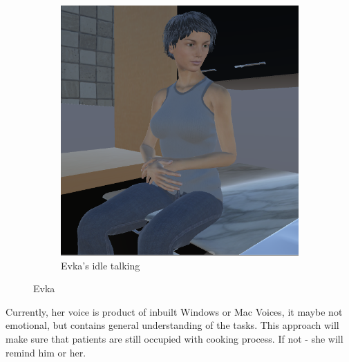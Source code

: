 \documentclass[18pt]{article}
\numberwithin{equation}{section} %
\numberwithin{figure}{section} %
\numberwithin{table}{section} %
\begin{document}
\begin{figure}[H]
\begin{subfigure}{0.4\textwidth}
				\includegraphics[width=0.96\linewidth]{images/Evka_sit_2}
				\caption{Evka's idle talking}
			\end{subfigure}		
			\caption{Evka}
			\label{fig:evkasit1}
		\end{figure}
		
		
		Currently, her voice is product of inbuilt Windows or Mac Voices, it maybe not emotional, but contains general understanding of the tasks. This approach will make sure that patients are still occupied with cooking process. If not - she will remind him or her. \\	
		
\end{document}
